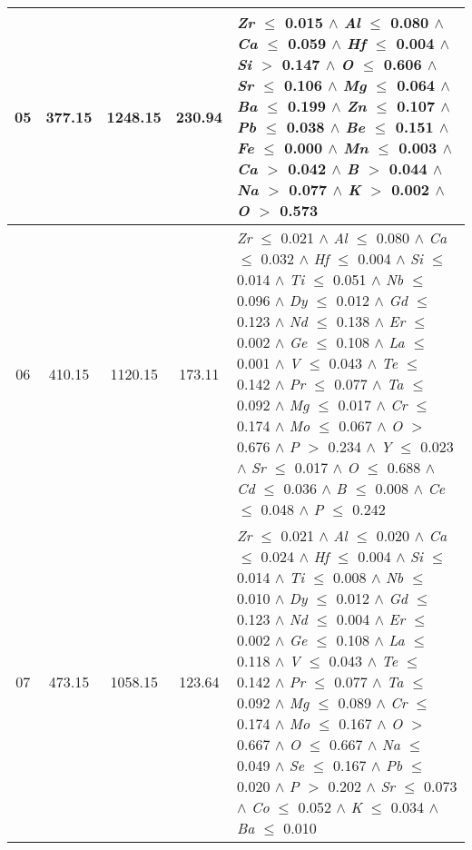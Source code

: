 \begin{table}[!htbp]
\begin{tabular}{ccccm{}}
		\hline
		05 & 377.15 & 1248.15 & 230.94 & \textit{Zr} $\le$ 0.015 $\wedge$ \textit{Al} $\le$ 0.080 $\wedge$ \textit{Ca} $\le$ 0.059 $\wedge$ \textit{Hf} $\le$ 0.004 $\wedge$ \textit{Si} $>$ 0.147 $\wedge$ \textit{O} $\le$ 0.606 $\wedge$ \textit{Sr} $\le$ 0.106 $\wedge$ \textit{Mg} $\le$ 0.064 $\wedge$ \textit{Ba} $\le$ 0.199 $\wedge$ \textit{Zn} $\le$ 0.107 $\wedge$ \textit{Pb} $\le$ 0.038 $\wedge$ \textit{Be} $\le$ 0.151 $\wedge$ \textit{Fe} $\le$ 0.000 $\wedge$ \textit{Mn} $\le$ 0.003 $\wedge$ \textit{Ca} $>$ 0.042 $\wedge$ \textit{B} $>$ 0.044 $\wedge$ \textit{Na} $>$ 0.077 $\wedge$ \textit{K} $>$ 0.002 $\wedge$ \textit{O} $>$ 0.573\\
		\hline
		06 & 410.15 & 1120.15 & 173.11 & \textit{Zr} $\le$ 0.021 $\wedge$ \textit{Al} $\le$ 0.080 $\wedge$ \textit{Ca} $\le$ 0.032 $\wedge$ \textit{Hf} $\le$ 0.004 $\wedge$ \textit{Si} $\le$ 0.014 $\wedge$ \textit{Ti} $\le$ 0.051 $\wedge$ \textit{Nb} $\le$ 0.096 $\wedge$ \textit{Dy} $\le$ 0.012 $\wedge$ \textit{Gd} $\le$ 0.123 $\wedge$ \textit{Nd} $\le$ 0.138 $\wedge$ \textit{Er} $\le$ 0.002 $\wedge$ \textit{Ge} $\le$ 0.108 $\wedge$ \textit{La} $\le$ 0.001 $\wedge$ \textit{V} $\le$ 0.043 $\wedge$ \textit{Te} $\le$ 0.142 $\wedge$ \textit{Pr} $\le$ 0.077 $\wedge$ \textit{Ta} $\le$ 0.092 $\wedge$ \textit{Mg} $\le$ 0.017 $\wedge$ \textit{Cr} $\le$ 0.174 $\wedge$ \textit{Mo} $\le$ 0.067 $\wedge$ \textit{O} $>$ 0.676 $\wedge$ \textit{P} $>$ 0.234 $\wedge$ \textit{Y} $\le$ 0.023 $\wedge$ \textit{Sr} $\le$ 0.017 $\wedge$ \textit{O} $\le$ 0.688 $\wedge$ \textit{Cd} $\le$ 0.036 $\wedge$ \textit{B} $\le$ 0.008 $\wedge$ \textit{Ce} $\le$ 0.048 $\wedge$ \textit{P} $\le$ 0.242\\
		\hline
		07 & 473.15 & 1058.15 & 123.64 & \textit{Zr} $\le$ 0.021 $\wedge$ \textit{Al} $\le$ 0.020 $\wedge$ \textit{Ca} $\le$ 0.024 $\wedge$ \textit{Hf} $\le$ 0.004 $\wedge$ \textit{Si} $\le$ 0.014 $\wedge$ \textit{Ti} $\le$ 0.008 $\wedge$ \textit{Nb} $\le$ 0.010 $\wedge$ \textit{Dy} $\le$ 0.012 $\wedge$ \textit{Gd} $\le$ 0.123 $\wedge$ \textit{Nd} $\le$ 0.004 $\wedge$ \textit{Er} $\le$ 0.002 $\wedge$ \textit{Ge} $\le$ 0.108 $\wedge$ \textit{La} $\le$ 0.118 $\wedge$ \textit{V} $\le$ 0.043 $\wedge$ \textit{Te} $\le$ 0.142 $\wedge$ \textit{Pr} $\le$ 0.077 $\wedge$ \textit{Ta} $\le$ 0.092 $\wedge$ \textit{Mg} $\le$ 0.089 $\wedge$ \textit{Cr} $\le$ 0.174 $\wedge$ \textit{Mo} $\le$ 0.167 $\wedge$ \textit{O} $>$ 0.667 $\wedge$ \textit{O} $\le$ 0.667 $\wedge$ \textit{Na} $\le$ 0.049 $\wedge$ \textit{Se} $\le$ 0.167 $\wedge$ \textit{Pb} $\le$ 0.020 $\wedge$ \textit{P} $>$ 0.202 $\wedge$ \textit{Sr} $\le$ 0.073 $\wedge$ \textit{Co} $\le$ 0.052 $\wedge$ \textit{K} $\le$ 0.034 $\wedge$ \textit{Ba} $\le$ 0.010\\

\end{tabular}
\end{table}
